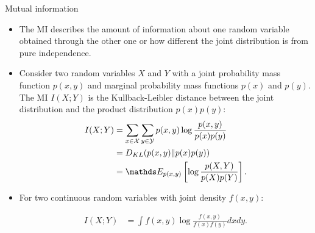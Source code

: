 \documentclass[11pt,compress,t,notes=noshow, xcolor=table]{beamer}
\begin{document}
\begin{vbframe} {Mutual information}

% 

\begin{itemize}
\item The MI describes the amount of information about one random variable obtained through the other one or how different the joint distribution is from pure independence.
\item Consider two random variables $X$ and $Y$ with a joint probability mass function $p(x, y)$ and marginal probability mass functions $p(x)$ and $p(y)$. The MI $I (X;Y)$ is the Kullback-Leibler distance between the joint distribution and the product distribution $p(x)p(y)$:
\footnotesize
\begin{equation*}\begin{aligned}
I(X ; Y) &=\sum_{x \in \Xspace} \sum_{y \in \Yspace} p(x, y) \log \frac{p(x, y)}{p(x) p(y)} \\
&=D_{KL}(p(x, y) \| p(x) p(y)) \\
&=\E_{p(x, y)} \left[ \log \frac{p(X, Y)}{p(X) p(Y)} \right].
\end{aligned}\end{equation*}
\normalsize

\item For two continuous random variables with joint density $f(x,y)$:

\footnotesize
\begin{equation*}\begin{aligned}
I(X ; Y) &= \int f(x,y) \log \frac{f(x,y)}{f(x)f(y)} dx dy.
\end{aligned}
\end{equation*}
\normalsize

\end{itemize}

\end{vbframe}
\end{document}
